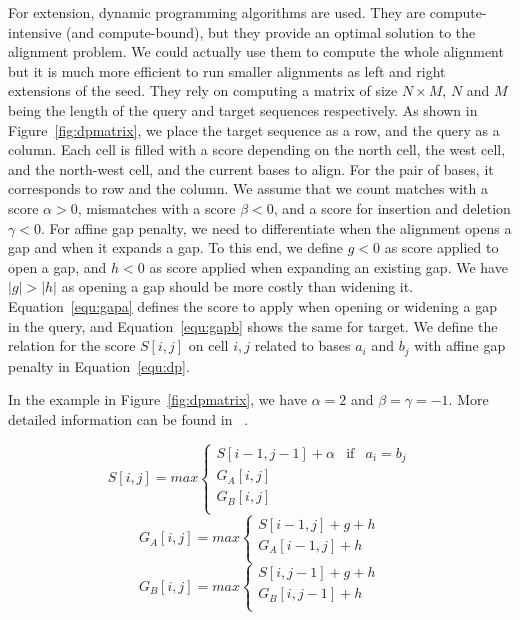 For extension, dynamic programming algorithms are used. They are compute-intensive (and compute-bound), but they provide an optimal solution to the alignment problem. We could actually use them to compute the whole alignment but it is much more efficient to run smaller alignments as left and right extensions of the seed. They rely on computing a matrix of size $N \times M$, $N$ and $M$ being the length of the query and target sequences respectively. As shown in Figure~\ref{fig:dpmatrix}, we place the target sequence as a row, and the query as a column. Each cell is filled with a score depending on the north cell, the west cell, and the north-west cell, and the current bases to align. For the pair of bases, it corresponds to row and the column. We assume that we count matches with a score $\alpha > 0$, mismatches with a score $\beta < 0$, and a score for insertion and deletion $\gamma < 0$. For affine gap penalty, we need to differentiate when the alignment opens a gap and when it expands a gap. To this end, we define $g < 0$ as score applied to open a gap, and $h < 0$ as score applied when expanding an existing gap. We have $|g| > |h|$ as opening a gap should be more costly than widening it. Equation~\ref{equ:gapa} defines the score to apply when opening or widening a gap in the query, and Equation~\ref{equ:gapb} shows the same for target. We define the relation for the score $S[i,j]$ on cell $i,j$ related to bases $a_i$ and $b_j$ with affine gap penalty in Equation~\ref{equ:dp}.

In the example in Figure~\ref{fig:dpmatrix}, we have $\alpha = 2$ and $\beta = \gamma = -1$. More detailed information can be found in ~\cite{Aluru:2005:HCM:1121650}.

\begin{equation}
 	S[i,j] = max \left\{
 	\begin{array}{llll}
 		S[i-1, j-1] + \alpha & \mbox{if} & a_i = b_j \\
 		G_{A}[i,j] \\
 		G_{B}[i,j]\\
 	\end{array}
 	\right.
 	\label{equ:dp}
 \end{equation}
 \begin{equation}
 	G_{A}[i,j] = max \left\{
 	\begin{array}{ll}
 		S[i-1, j] + g + h \\
 		G_{A}[i-1,j] + h \\
 		 
 	\end{array}
 	\right.
 	\label{equ:gapa}
 \end{equation}
  \begin{equation}
 	G_{B}[i,j] = max \left\{
 	\begin{array}{ll}
 		S[i, j-1] + g + h \\
 		G_{B}[i,j-1] + h \\
 		 
 	\end{array}
 	\right.
 	\label{equ:gapb}
 \end{equation}
 
